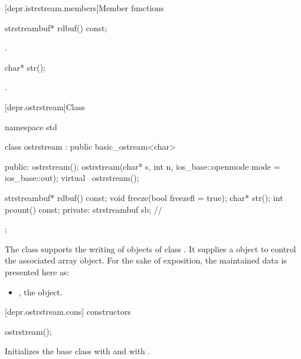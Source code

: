 [depr.istrstream.members]{Member functions}

%
\begin{itemdecl}
strstreambuf* rdbuf() const;
\end{itemdecl}

\begin{itemdescr}
\pnum
\returns
{}.
\end{itemdescr}

%
\begin{itemdecl}
char* str();
\end{itemdecl}

\begin{itemdescr}
\pnum
\returns
{}.
\end{itemdescr}

[depr.ostrstream]{Class }

%
\begin{codeblock}
namespace std {
  class ostrstream : public basic_ostream<char> {
  public:
    ostrstream();
    ostrstream(char* s, int n, ios_base::openmode mode = ios_base::out);
    virtual ~ostrstream();

    strstreambuf* rdbuf() const;
    void freeze(bool freezefl = true);
    char* str();
    int pcount() const;
  private:
    strstreambuf sb;            // \expos
  };
}
\end{codeblock}

\pnum
The class
supports the writing of objects of class
.
It supplies a
object to control the associated array object.
For the sake of exposition, the maintained data is presented here as:

\begin{itemize}
\item
{}, the  object.
\end{itemize}

[depr.ostrstream.cons]{ constructors}

%
\begin{itemdecl}
ostrstream();
\end{itemdecl}

\begin{itemdescr}
\pnum
\effects
Initializes the base class with  and
 with .
\end{itemdescr}

